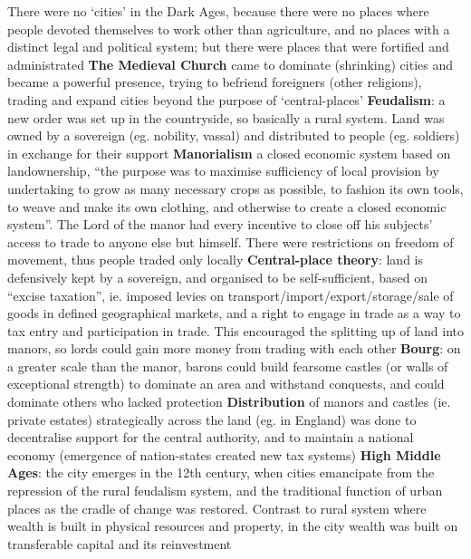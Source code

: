 \documentclass{article}
\begin{document}
\begin{outline}
		\2 There were no `cities' in the Dark Ages, because there were no places where people devoted themselves to work other than agriculture, and no places with a distinct legal and political system; but there were places that were fortified and administrated
	\1 \textbf{The Medieval Church} came to dominate (shrinking) cities and became a powerful presence, trying to befriend foreigners (other religions),  trading and expand cities beyond the purpose of `central-places'
	\1 \textbf{Feudalism}: a new order was set up in the countryside, so basically a rural system. Land was owned by a sovereign (eg. nobility, vassal) and distributed to people (eg. soldiers) in exchange for their support
		\2 \textbf{Manorialism} a closed economic system based on landownership, ``the purpose was to maximise sufficiency of local provision by undertaking to grow as many necessary crops as possible, to fashion its own tools, to weave and make its own clothing, and otherwise to create a closed economic system''. The Lord of the manor had every incentive to close off his subjects' access to trade to anyone else but himself. There were restrictions on freedom of movement, thus people traded only locally
		\2 \textbf{Central-place theory}: land is defensively kept by a sovereign, and organised to be self-sufficient, based on ``excise taxation'', ie. imposed levies on transport/import/export/storage/sale of goods in defined geographical markets, and a right to engage in trade as a way to tax entry and participation in trade. This encouraged the splitting up of land into manors, so lords could gain more money from trading with each other
		\2 \textbf{Bourg}: on a greater scale than the manor, barons could build fearsome castles (or walls of exceptional strength) to dominate an area and withstand conquests, and could dominate others who lacked protection
		\2 \textbf{Distribution} of manors and castles (ie. private estates) strategically across the land (eg. in England) was done to decentralise support for the central authority, and to maintain a national economy (emergence of nation-states created new tax systems)
	\1 \textbf{High Middle Ages}: the city emerges in the 12th century, when cities emancipate from the repression of the rural feudalism system, and the traditional function of urban places as the cradle of change was restored. Contrast to rural system where wealth is built in physical resources and property, in the city wealth was built on transferable capital and its reinvestment
\end{outline}
\end{document}
